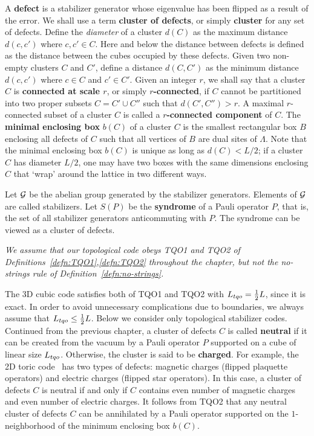 A {\bf defect} is a stabilizer generator whose eigenvalue has been flipped as a result of the error.
We shall use a term {\bf cluster of defects}, or simply {\bf cluster}
for any set of defects.  Define the {\em diameter} of a cluster $d(C)$ as
the maximum distance $d(c,c')$ where $c,c'\in C$.
Here and below  the distance between defects is defined as the distance between the cubes
occupied by these defects.
Given two non-empty clusters $C$ and $C'$,
define a distance $d(C,C')$ as the minimum distance $d(c,c')$ where $c\in C$ and $c'\in C'$.
Given an integer $r$, we shall say that a cluster $C$ is {\bf connected at scale $r$},
or simply {\bf $r$-connected}, if $C$
cannot be partitioned into two proper subsets $C=C'\cup C''$ such that $d(C',C'')>r$.
A maximal $r$-connected subset of a cluster $C$  is called a {\bf $r$-connected component} of $C$.
The {\bf minimal enclosing box} $b(C)$ of a cluster $C$ is the smallest
rectangular box $B$ enclosing all defects of $C$ 
such that all vertices of $B$ are dual sites of $\Lambda$.  
Note that the minimal enclosing box $b(C)$ is unique as long as $d(C)<L/2$;
if a cluster $C$ has diameter $L/2$, 
one may have two boxes with the same dimensions
enclosing $C$ that `wrap' around the lattice in two different ways.


Let $\cal G$ be the abelian group
generated by the stabilizer generators. Elements of $\cal G$ are called stabilizers.
Let $S(P)$ be the {\bf syndrome} of a Pauli operator $P$, that is,
the set of all stabilizer generators anticommuting with $P$.
The syndrome can be viewed as a cluster of defects.
\vspace{3mm}
\begin{center}
\parbox{.8\textwidth}{\em
We assume that our topological code obeys TQO1 and TQO2 of 
Definitions~\ref{defn:TQO1},\ref{defn:TQO2} throughout the chapter,
but not the no-strings rule of Definition~\ref{defn:no-strings}.
}
\end{center}
\vspace{3mm}
The 3D cubic code satisfies both of TQO1 and TQO2 with
${L_{tqo}} = \frac{1}{2} L$, since it is exact.
In order to avoid unnecessary complications due to boundaries,
we always assume that ${L_{tqo}} \le \frac{1}{2} L$.
Below we consider only topological stabilizer codes.
Continued from the previous chapter,
a cluster of defects $C$ is called {\bf neutral} 
if it can be created from the vacuum by a Pauli operator $P$ 
supported on a cube of linear size ${L_{tqo}}$. 
Otherwise, the cluster is said to be {\bf charged}.
For example, the 2D toric code~\cite{Kitaev2003Fault-tolerant} has two types of defects:
magnetic charges (flipped plaquette operators) and electric charges (flipped star operators).
In this case,
a cluster of defects $C$ is neutral if and only if
$C$ contains even number of magnetic charges and even number of electric charges.
It follows from TQO2
that any neutral cluster of defects $C$ can be annihilated 
by a Pauli operator supported on the $1$-neighborhood
of the minimum enclosing box $b(C)$.



